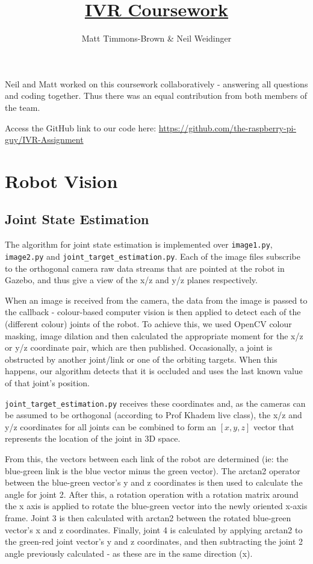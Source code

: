 \documentclass[11pt]{article}
\title{\underline{IVR Coursework}}
\author{Matt Timmons-Brown \& Neil Weidinger}
\begin{document}
\maketitle

Neil and Matt worked on this coursework collaboratively - answering all questions and coding together. Thus there was an equal contribution from both members of the team.

Access the GitHub link to our code here: \url{https://github.com/the-raspberry-pi-guy/IVR-Assignment}

\setcounter{section}{1}
\section{Robot Vision}

\subsection{Joint State Estimation}

The algorithm for joint state estimation is implemented over \texttt{image1.py}, \texttt{image2.py} and \texttt{joint\_target\_estimation.py}. Each of the image files subscribe to the orthogonal camera raw data streams that are pointed at the robot in Gazebo, and thus give a view of the x/z and y/z planes respectively. 

When an image is received from the camera, the data from the image is passed to the callback - colour-based computer vision is then applied to detect each of the (different colour) joints of the robot. To achieve this, we used OpenCV colour masking, image dilation and then calculated the appropriate moment for the x/z or y/z coordinate pair, which are then published. Occasionally, a joint is obstructed by another joint/link or one of the orbiting targets. When this happens, our algorithm detects that it is occluded and uses the last known value of that joint's position.

\texttt{joint\_target\_estimation.py} receives these coordinates and, as the cameras can be assumed to be orthogonal (according to Prof Khadem live class), the x/z and y/z coordinates for all joints can be combined to form an $[x,y,z]$ vector that represents the location of the joint in 3D space.

From this, the vectors between each link of the robot are determined (ie: the blue-green link is the blue vector minus the green vector). The arctan2 operator between the blue-green vector's y and z coordinates is then used to calculate the angle for joint 2. After this, a rotation operation with a rotation matrix around the x axis is applied to rotate the blue-green vector into the newly oriented x-axis frame. Joint 3 is then calculated with arctan2 between the rotated blue-green vector's x and z coordinates. Finally, joint 4 is calculated by applying arctan2 to the green-red joint vector's y and z coordinates, and then subtracting the joint 2 angle previously calculated - as these are in the same direction (x).
\end{document}
